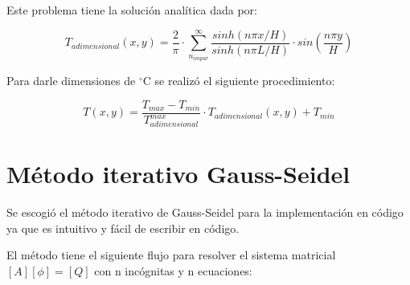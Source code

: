 \documentclass[article,latterpaper]{article}
\begin{document}
Este problema tiene la solución analítica dada por:

\begin{equation}
    T_{adimensional}(x,y) = \frac{2}{\pi}\cdot\sum_{n_{impar}}^\infty\frac{sinh(n\pi x/H)}{sinh(n\pi L/H)}\cdot sin(\frac{n\pi y}{H})
    \label{Sol_An_Ad}
\end{equation}

Para darle dimensiones de $^{\circ}\mathrm{C}$ se realizó el siguiente procedimiento:

\begin{equation}
    T(x,y)=\frac{T_{max}-T_{min}}{T_{adimensional}^{max}}\cdot T_{adimensional}(x,y) + T_{min}
    \label{Sol_An}
\end{equation}

\section{Método iterativo Gauss-Seidel}

Se escogió el método iterativo de Gauss-Seidel para la implementación en código ya que es intuitivo y fácil de escribir en código.

El método tiene el siguiente flujo para resolver el sistema matricial $[A][\phi]=[Q]$ con n incógnitas y n ecuaciones:
\end{document}
